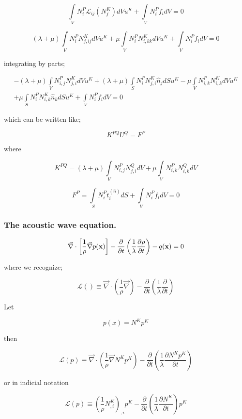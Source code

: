 \[\int\limits_V {N_i^P{\mathcal{L}_{ij}}(N_j^K)dV{u^K}}  + \int\limits_V {N_i^P{f_i}dV = 0} \]

\[(\lambda  + \mu )\int\limits_V {N_i^PN_{j,ij}^KdV{u^K}}  + \mu \int\limits_V {N_i^PN_{i,kk}^KdV{u^K}}  + \int\limits_V {N_i^P{f_i}dV = 0} \]

integrating by parts;

\begin{align*}
- (\lambda  + \mu )\int\limits_V {N_{i,j}^PN_{j,i}^KdV{u^K} + (\lambda  + \mu )\int\limits_S {N_i^PN_{j,i}^K{{\hat n}_j}dS{u^K} - \mu \int\limits_V {N_{i,k}^PN_{i,k}^KdV{u^K}} } } \\
+ \mu \int\limits_S {N_i^PN_{i,k}^K{{\hat n}_k}dS{u^K}}  + \int\limits_V {N_i^P{f_i}dV = 0}
\end{align*}

which can be written like;


\[{K^{PQ}}{U^Q} = {F^P}\]

where

\[{K^{PQ}} = (\lambda  + \mu )\int\limits_V {N_{i,j}^PN_{j,i}^QdV}  + \mu \int\limits_V {N_{i,k}^PN_{i,k}^QdV} \]

\[{F^P} = \int\limits_S {N_i^Pt_i^{(\hat n)}dS + \int\limits_V {N_i^P{f_i}dV = 0} } \]

\subsubsection*{The acoustic wave equation.}

\[\vec \nabla  \cdot \left[ {\frac{1}{\rho }\vec \nabla p(\vb{x})} \right] - \frac{\partial }{{\partial t}}\left( {\frac{1}{\lambda }\frac{{\partial \rho }}{{\partial t}}} \right) - q(\vb{x}) = 0\]

where we recognize;

\[\mathcal{L}() \equiv \vec \nabla  \cdot \left( {\frac{1}{\rho }\vec \nabla } \right) - \frac{\partial }{{\partial t}}\left( {\frac{1}{\lambda }\frac{\partial }{{\partial t}}} \right)\]

Let

\[p(x) = {N^K}{p^K}\]

then

\[\mathcal{L}(p) \equiv \vec \nabla  \cdot \left( {\frac{1}{\rho }\vec \nabla {N^K}{p^K}} \right) - \frac{\partial }{{\partial t}}\left( {\frac{1}{\lambda }\frac{{\partial {N^K}{p^K}}}{{\partial t}}} \right)\]

or in indicial notation

\[\mathcal{L}(p) \equiv {\left( {\frac{1}{\rho }N_{,i}^K} \right)_{,i}}{p^K} - \frac{\partial }{{\partial t}}\left( {\frac{1}{\lambda }\frac{{\partial {N^K}}}{{\partial t}}} \right){p^K}\]

